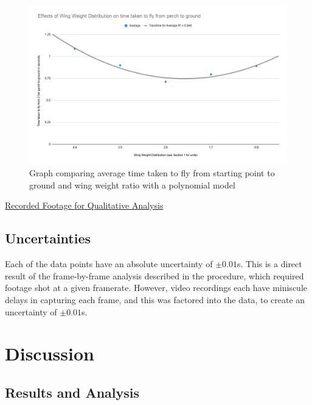 \documentclass[]{article}
\theoremstyle{definition}
\begin{document}
\begin{figure}[H]
    \centering
    \includegraphics[scale=0.35]{graphics/graph-quadratic.png}
    \caption{Graph comparing average time taken to fly from starting point to ground and wing weight ratio with a polynomial model}
    \label{Quadratic Chart}
\end{figure}

\href{https://drive.google.com/open?id=1pxjHiAVFEnyUj759QoK4n0mFYVah-jPS}{Recorded Footage for Qualitative Analysis} \label{Qualitative Data Footage}

\subsection{Uncertainties}
Each of the data points have an absolute uncertainty of $\pm 0.01$s. This is a direct result of the frame-by-frame analysis described in the procedure, which required footage shot at a given framerate. However, video recordings each have miniscule delays in capturing each frame, and this was factored into the data, to create an uncertainty of $\pm 0.01$s.

\section{Discussion}

\subsection{Results and Analysis}
\end{document}

